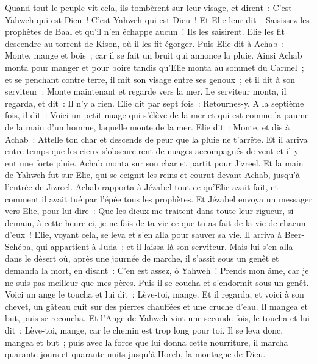 \begin{multicols}{2}
Quand tout le peuple vit cela, ils tombèrent sur leur visage, et dirent~: C'est Yahweh qui est Dieu~! C'est Yahweh qui est Dieu~!
Et Elie leur dit~: Saisissez les prophètes de Baal et qu'il n'en échappe aucun~! Ils les saisirent. Elie les fit descendre au torrent de Kison, où il les fit égorger.
Puis Elie dit à Achab~: Monte, mange et bois~; car il se fait un bruit qui annonce la pluie.
Ainsi Achab monta pour manger et pour boire tandis qu'Elie monta au sommet du Carmel~; et se penchant contre terre, il mit son visage entre ses genoux~;
et il dit à son serviteur~: Monte maintenant et regarde vers la mer. Le serviteur monta, il regarda, et dit~: Il n'y a rien. Elie dit par sept fois~: Retournes-y.
A la septième fois, il dit~: Voici un petit nuage qui s'élève de la mer et qui est comme la paume de la main d'un homme, laquelle monte de la mer. Elie dit~: Monte, et dis à Achab~: Attelle ton char et descends de peur que la pluie ne t'arrête.
Et il arriva entre temps que les cieux s'obscurcirent de nuages accompagnés de vent et il y eut une forte pluie. Achab monta sur son char et partit pour Jizreel.
Et la main de Yahweh fut sur Elie, qui se ceignit les reins et courut devant Achab, jusqu'à l'entrée de Jizreel.
\VerseOne{}Achab rapporta à Jézabel tout ce qu'Elie avait fait, et comment il avait tué par l'épée tous les prophètes.
Et Jézabel envoya un messager vers Elie, pour lui dire~: Que les dieux me traitent dans toute leur rigueur, si demain, à cette heure-ci, je ne fais de ta vie ce que tu as fait de la vie de chacun d'eux~!
Elie, voyant cela, se leva et s'en alla pour sauver sa vie. Il arriva à Beer-Schéba, qui appartient à Juda~; et il laissa là son serviteur.
Mais lui s'en alla dans le désert où, après une journée de marche, il s'assit sous un genêt et demanda la mort, en disant~: C'en est assez, ô Yahweh~! Prends mon âme, car je ne suis pas meilleur que mes pères.
Puis il se coucha et s'endormit sous un genêt. Voici un ange le toucha et lui dit~: Lève-toi, mange.
Et il regarda, et voici à son chevet, un gâteau cuit sur des pierres chauffées et une cruche d'eau. Il mangea et but, puis se recoucha.
Et l'Ange de Yahweh vint une seconde fois, le toucha et lui dit~: Lève-toi, mange, car le chemin est trop long pour toi.
Il se leva donc, mangea et but~; puis avec la force que lui donna cette nourriture, il marcha quarante jours et quarante nuits jusqu'à Horeb, la montagne de Dieu.

\end{multicols}
